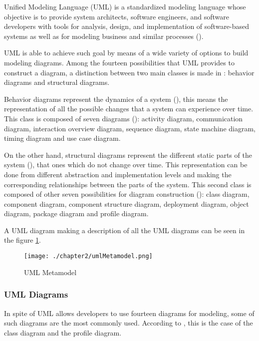 Unified Modeling Language (UML) is a standardized modeling language whose objective is to provide system architects, software engineers, and software developers with tools for analysis, design, and implementation of software-based systems as well as for modeling business and similar processes (\cite{umlwebsite}).

UML is able to achieve such goal by means of a wide variety of options to build modeling diagrams. Among the fourteen possibilities that UML provides to construct a diagram, a distinction between two main classes is made in \cite{umlwebsite}: behavior diagrams and structural diagrams.

Behavior diagrams represent the dynamics of a system (\cite{umlwebsite}), this means the representation of all the possible changes that a system can experience over time. This class is composed of seven diagrams (\cite{umlwebsite}): activity diagram, communication diagram, interaction overview diagram, sequence diagram, state machine diagram, timing diagram and use case diagram.

On the other hand, structural diagrams represent the different static parts of the system (\cite{umlwebsite}), that ones which do not change over time. This representation can be done from different abstraction and implementation levels and making the corresponding relationships between the parts of the system. This second class is composed of other seven possibilities for diagram construction (\cite{umlwebsite}): class diagram, component diagram, component structure diagram, deployment diagram, object diagram, package diagram and profile diagram.

A UML diagram making a description of all the UML diagrams can be seen in the figure \ref{fig:UML Metamodel}.

\begin{figure}
\centering
{\texttt{[image: ./chapter2/umlMetamodel.png]}}
\caption{UML Metamodel}
\label{fig:UML Metamodel}
\end{figure}

\subsubsection{UML Diagrams}

In spite of UML allows developers to use fourteen diagrams for modeling, some of such diagrams are the most commonly used. According to \cite{umlwebsite}, this is the case of the class diagram and the profile diagram.

